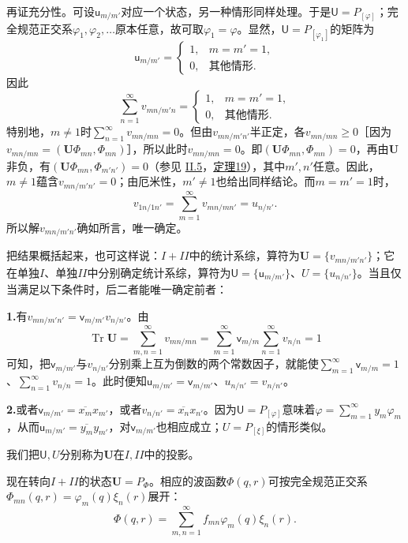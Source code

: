 \documentclass[fontsize=13pt,twoside,openany,headings=normal,parskip=false,bookmarkpackage=false,DIV=calc]{scrbook}
\begin{document}
再证充分性。可设$\mathsf u_{m/m'}$对应一个状态，另一种情形同样处理。于是$\mathsf U=P_{[\varphi]}$；完全规范正交系$\varphi_1,\allowbreak \varphi_2,\allowbreak \ldots$原本任意，故可取$\varphi_1=\varphi$。显然，$\mathsf U=P_{[\varphi_1]}$的矩阵为
\[
 \mathsf u_{m/m'}=\begin{cases}1,&m=m'=1,\\0,&\text{其他情形}.\end{cases}
\]
因此
\[
 \sum_{n=1}^{\infty}v_{mn/m'n}
 =\begin{cases}1,&m=m'=1,\\0,&\text{其他情形}.\end{cases}
\]
特别地，$m\ne1$时$\sum_{n=1}^{\infty}v_{mn/mn}=0$。但由$v_{mn/m'n'}$半正定，各$v_{mn/mn}\geq0$［因为$v_{mn/mn}=(\boldsymbol U\Phi_{mn},\allowbreak \Phi_{mn})$］，所以此时$v_{mn/mn}=0$。即$(\boldsymbol U\Phi_{mn},\allowbreak \Phi_{mn})=0$，再由$\boldsymbol U$非负，有$(\boldsymbol U\Phi_{mn},\allowbreak \Phi_{m'n'})=0$（参见 \hyperref[sec:II.5]{II.5}，\CJKglue \hyperref[thm:II.19]{定理19}），其中$m',\allowbreak n'$任意。因此，$m\ne1$蕴含$v_{mn/m'n'}=0$；由厄米性，$m'\ne1$也给出同样结论。而$m=m'=1$时，
\[
 v_{1n/1n'}=\sum_{m=1}^{\infty}v_{mn/mn'}=u_{n/n'}.
\]
所以解$v_{mn/m'n'}$确如所言，唯一确定。

把结果概括起来，也可这样说：$I+II$中的统计系综，算符为$\boldsymbol U=\{v_{mn/m'n'}\}$；它在单独$I$、单独$II$中分别确定统计系综，算符为$\mathsf U=\{\mathsf u_{m/m'}\}$、$U=\{u_{n/n'}\}$。当且仅当满足以下条件时，后二者能唯一确定前者：

\textbf{1.}有$v_{mn/m'n'}=\mathsf v_{m/m'}v_{n/n'}$。由
\[
 \operatorname{Tr}\boldsymbol U=\sum_{m,n=1}^{\infty}v_{mn/mn}
 =\sum_{m=1}^{\infty}\mathsf v_{m/m}\sum_{n=1}^{\infty}v_{n/n}=1
\]
可知，把$\mathsf v_{m/m'}$与$v_{n/n'}$分别乘上互为倒数的两个常数因子，就能使$\sum_{m=1}^{\infty}\mathsf v_{m/m}=1$、$\sum_{n=1}^{\infty}v_{n/n}=1$。\hypertarget{origpage-229}{}\label{origpage-229}此时便知$\mathsf u_{m/m'}=\mathsf v_{m/m'}$、$u_{n/n'}=v_{n/n'}$。

\textbf{2.}或者$\mathsf v_{m/m'}=\overline{x_m}x_{m'}$，或者$v_{n/n'}=\overline{x_n}x_{n'}$。因为$\mathsf U=P_{[\varphi]}$意味着$\varphi=\sum_{m=1}^{\infty}y_m\varphi_m$，从而$\mathsf u_{m/m'}=\overline{y_m}y_{m'}$，对$\mathsf v_{m/m'}$也相应成立；$U=P_{[\xi]}$的情形类似。

我们把$\mathsf U,\allowbreak U$分别称为$\boldsymbol U$在$I,\allowbreak II$中的投影。

现在转向$I+II$的状态$\boldsymbol U=P_\Phi$。相应的波函数$\Phi(q,\allowbreak r)$可按完全规范正交系$\Phi_{mn}(q,\allowbreak r)=\varphi_m(q)\xi_n(r)$展开：
\[
 \Phi(q,r)=\sum_{m,n=1}^{\infty}f_{mn}\varphi_m(q)\xi_n(r).
\]
\end{document}

